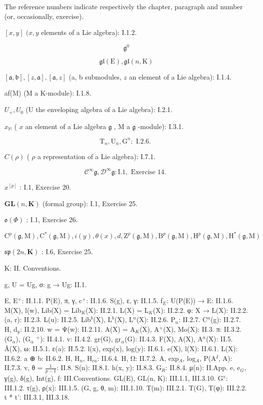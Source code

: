 
The reference numbers indicate respectively the chapter, paragraph and number (or, occasionally, exercise).

\([x,y]\) \((x,y\) elements of a Lie algebra): I.1.2.

\[
\mathfrak {g} ^ {0}
\]

\[
\mathfrak {g l} (\mathrm{E}), \mathfrak {g l} (n, \mathrm{K})
\]

\([\mathfrak{a},\mathfrak{b}],[z,\mathfrak{a}],[\mathfrak{a},z]\) (a, b submodules, \(z\) an element of a Lie algebra): I.1.4.

af(M) (M a K-module): I.1.8.

\(U_{+}, U_{0}\) (U the enveloping algebra of a Lie algebra): I.2.1.

\(x_{\mathbb{M}}\) ( \(x\) an element of a Lie algebra \(\mathfrak{g}\) , M a \(\mathfrak{g}\) -module): I.3.1.

\[
\mathrm{T} _ {n}, \mathrm{U} _ {n}, \mathrm{G} ^ {n}: \text { I.2.6. }
\]

\(C(\rho)\) ( \(\rho\) a representation of a Lie algebra): I.7.1.

\[
\mathcal {C} ^ {\infty} \mathfrak {g}, \mathcal {D} ^ {\infty} \mathfrak {g}: \mathrm{I}. 1, \text { Exercise 14. }
\]

\(x^{[p]}\) : I.1, Exercise 20.

\(\mathbf{GL}(n,\mathbf{K})\) (formal group): I.1, Exercise 25.

\(\mathfrak{o}(\Phi)\) : I.1, Exercise 26.

\[
\mathrm{C} ^ {p} (\mathfrak {g}, \mathrm{M}), \mathrm{C} ^ {*} (\mathfrak {g}, \mathrm{M}), i (y), \theta (x), d, \mathrm{Z} ^ {p} (\mathfrak {g}, \mathrm{M}), \mathrm{B} ^ {p} (\mathfrak {g}, \mathrm{M}), \mathrm{H} ^ {p} (\mathfrak {g}, \mathrm{M}), \mathrm{H} ^ {*} (\mathfrak {g}, \mathrm{M})
\]

\(\mathfrak{sp}(2n,\mathbf{K})\) : I.6, Exercise 25.

K: II. Conventions.

g, U = Ug, σ: g → Ug: II.1.

E, E\(^{+}\): II.1.1. P(E), π, γ, c\(^{+}\): II.1.6. S(g), ε, γ: II.1.5. f\(_{E}\): U(P(E)) → E: II.1.6. M(X), l(w), Lib(X) = Lib\(_{K}\)(X): II.2.1. L(X) = L\(_{K}\)(X): II.2.2. φ: X → L(X): II.2.2. (a, r): II.2.3. L(u): II.2.5. Lib\(^{b}\)(X), L\(^{b}\)(X), L\(^{n}\)(X): II.2.6. P\(_{n}\): II.2.7. C\(^{n}\)(g): II.2.7. H, d\(_{y}\): II.2.10. w = Ψ(w): II.2.11. A(X) = A\(_{K}\)(X), A\(^{+}\)(X), Mo(X): II.3. π: II.3.2. (G\(_{\alpha}\)), (G\(_{\alpha}\) \(^{+}\)): II.4.1. v: II.4.2. gr(G), gr\(_{\alpha}\)(G): II.4.3. F(X), A(X), A\(^{n}\)(X): II.5. Â(X), ω: II.5.1. ε(a): II.5.2. l(x), exp(x), log(y): II.6.1. e(X), l(X): II.6.1. L(X): II.6.2. a ⊕ b: II.6.2. H, H\(_{n}\), H\(_{ra}\): II.6.4. H, Ω: II.7.2. A, exp\(_{A}\), log\(_{A}\), P(A\(^{I}\), A): II.7.3. v, θ = \(\frac{1}{p - 1}\): II.8. S(n): II.8.1. h(x, y): II.8.3. G\(_{R}\): II.8.4. μ(n): II.App. e, e\(_{G}\), γ(g), δ(g), Int(g), f: III.Conventions. GL(E), GL(n, K): III.1.1, III.3.10. G\(^{v}\): III.1.2. τ(g), ρ(x): III.1.5. (G, g, θ, m): III.1.10. T(m): III.2.1. T(G), T(φ): III.2.2. t * t': III.3.1, III.3.18.

